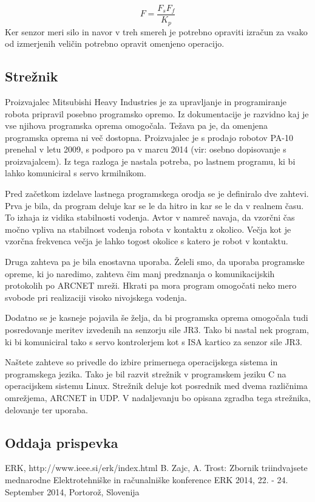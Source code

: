 \documentclass[a4paper]{article}
\begin{document}
\begin{equation}\label{eq:force_filt}
F = \frac{F_s  F_f}{K_p}
\end{equation}
Ker senzor meri silo in navor v treh smereh je potrebno opraviti izračun za vsako od izmerjenih veličin potrebno opravit omenjeno operacijo.

\subsection{Strežnik} \label{sec:streznik}

Proizvajalec Mitsubishi Heavy Industries je za upravljanje in programiranje robota pripravil posebno programsko opremo. Iz dokumentacije je razvidno kaj je vse njihova programska oprema omogočala. Težava pa je, da omenjena programska oprema ni več dostopna. Proizvajalec je s prodajo robotov PA-10 prenehal v letu 2009, s podporo pa v marcu 2014 (vir: osebno dopisovanje s proizvajalcem). Iz tega razloga je nastala potreba, po lastnem programu, ki bi lahko komuniciral s servo krmilnikom.

Pred začetkom izdelave lastnega programskega orodja se je definiralo dve zahtevi. Prva je bila, da program deluje kar se le da hitro in kar se le da v realnem času. To izhaja iz vidika stabilnosti vodenja. Avtor v \cite{mihelj_hapt} namreč navaja, da vzorčni čas močno vpliva na stabilnost vodenja robota v kontaktu z okolico. Večja kot je vzorčna frekvenca večja je lahko togost okolice s katero je robot v kontaktu.

Druga zahteva pa je bila enostavna uporaba. Želeli smo, da uporaba programske opreme, ki jo naredimo, zahteva čim manj predznanja o komunikacijskih protokolih po ARCNET mreži. Hkrati pa mora program omogočati neko mero svobode pri realizaciji visoko nivojskega vodenja.

Dodatno se je kasneje pojavila še želja, da bi programska oprema omogočala tudi posredovanje meritev izvedenih na senzorju sile JR3. Tako bi nastal nek program, ki bi komuniciral tako s servo kontrolerjem kot s ISA kartico za senzor sile JR3.

Naštete zahteve so privedle do izbire primernega operacijskega sistema in programskega jezika. Tako je bil razvit strežnik v programskem jeziku C na operacijskem sistemu Linux. Strežnik deluje kot posrednik med dvema različnima omrežjema, ARCNET in UDP.  V nadaljevanju bo opisana zgradba tega strežnika, delovanje ter uporaba.



\subsection{Oddaja prispevka}


\small
\begin{thebibliography}{1}

 ERK, http://www.ieee.si/erk/index.html 
 B. Zajc, A. Trost: Zbornik triindvajsete mednarodne Elektrotehniške in računalniške konference ERK 2014, 22. - 24. September 2014, Portorož, Slovenija

\end{thebibliography}
\end{document}
